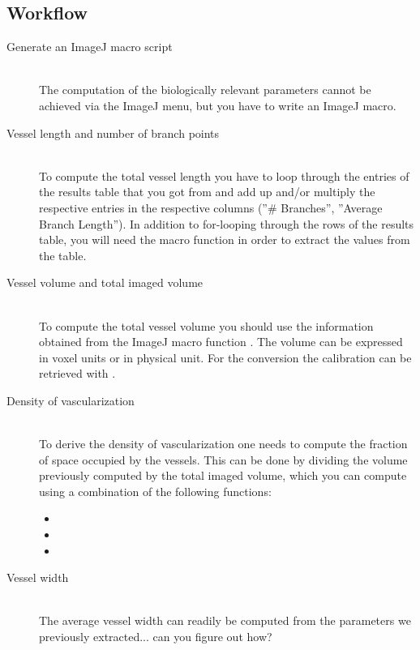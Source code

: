 \subsection{Workflow}
%
\begin{description}
%
\item[Generate an ImageJ macro script]\hfill\\
The computation of the biologically relevant parameters cannot be achieved via the ImageJ menu, but you have to write an ImageJ macro.
%
\item[Vessel length and number of branch points]\hfill\\
%
To compute the total vessel length you have to loop through the entries of the results table that you got from  and add up and/or multiply the respective entries in the respective columns (''\# Branches'', ''Average Branch Length''). In addition to for-looping through the rows of the results table, you will need the  macro function in order to extract the values from the table.
%
\item[Vessel volume and total imaged volume]\hfill\\
%
To compute the total vessel volume you should use the information obtained from the ImageJ macro function . The volume can be expressed in voxel units or in physical unit. For the conversion the calibration can be retrieved with .

\item[Density of vascularization]\hfill\\
To derive the density of vascularization one needs to compute the fraction of space occupied by the vessels. This can be done by dividing the volume previously computed by the total imaged volume, which you can compute using a combination of the following functions:
\begin{itemize}
\item {}
\item {}
\item {}
\end{itemize}
%
\item[Vessel width]\hfill\\
The average vessel width can readily be computed from the parameters we previously extracted... can you figure out how?

\end{description}

